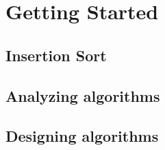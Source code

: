 \chapter{Getting Started}
\section{Insertion Sort}
\subsection{}

\subsection{}

\subsection{}

\subsection{}

\section{Analyzing algorithms}
\subsection{}

\subsection{}

\subsection{}

\section{Designing algorithms}
\subsection{}

\subsection{}

\setcounter{subsection}{3}
\subsection{}

\subsection{}

\subsection{}


